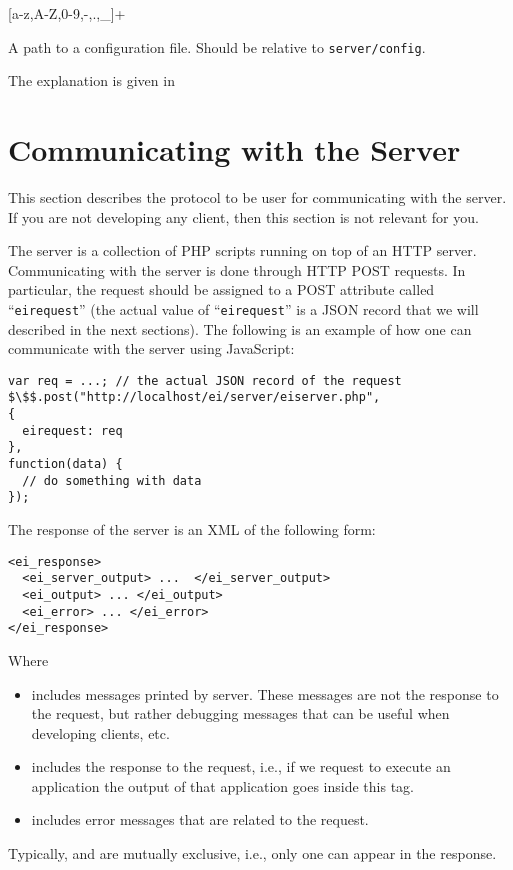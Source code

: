 [a-z,A-Z,0-9,-,.,\_]+

\bigskip
\noindent
{}

A path to a configuration file. Should be relative to
\texttt{server/config}.

\bigskip
\noindent
{}

The explanation is given in 

\section{Communicating with the \ei Server}
\label{ch:server:protocol}

This section describes the protocol to be user for communicating with
the \ei server. If you are not developing any \ei client, then this
section is not relevant for you.

The \ei server is a collection of PHP scripts running on top of an
HTTP server. Communicating with the server is done through HTTP POST
requests. In particular, the request should be assigned to a POST
attribute called ``\texttt{eirequest}'' (the actual value of
``\texttt{eirequest}'' is a JSON record that we will described in
the next sections). The following is an example of how one can
communicate with the server using JavaScript:

\bigskip
\begin{lstlisting}
var req = ...; // the actual JSON record of the request
$\$$.post("http://localhost/ei/server/eiserver.php",
{
  eirequest: req
},
function(data) { 
  // do something with data
});
\end{lstlisting}

\bigskip
\noindent
The response of the server is an XML of the following form:

\bigskip
\begin{lstlisting}
<ei_response>
  <ei_server_output> ...  </ei_server_output>
  <ei_output> ... </ei_output>
  <ei_error> ... </ei_error>
</ei_response>
\end{lstlisting}

\bigskip
\noindent
Where
%
\begin{itemize}
%
\item {} includes messages printed by
  server. These messages are not the response to the request, but
  rather debugging messages that can be useful when developing
  clients, etc.
%
\item {} includes the response to the request, i.e., if
  we request to execute an application the output of that application
  goes inside this tag.
%
\item {} includes error messages that are related to the
  request.
%
\end{itemize}
%
Typically,  and  are mutually exclusive,
i.e., only one can appear in the response.

